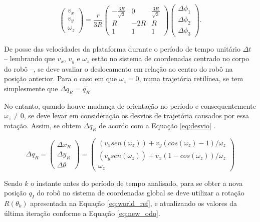 \begin{equation}
  \begin{pmatrix}
    v_x \\
    v_y \\
    \omega_z
  \end{pmatrix}
  =
  \frac{r}{3R}
  \begin{pmatrix}
    -\frac{3R}{\sqrt{3}} & 0   & \frac{3R}{\sqrt{3}} \\
    R                    & -2R & R                   \\
    1                    & 1   & 1
  \end{pmatrix}
  \begin{pmatrix}
    \Delta{\phi_1} \\
    \Delta{\phi_2} \\
    \Delta{\phi_3}
  \end{pmatrix}.
  \label{eq:odo}
\end{equation}

De posse das velocidades da plataforma durante o período de tempo unitário $\Delta t$ -- lembrando que $v_x$, $v_y$ e $\omega_z$ estão no sistema de coordenadas centrado no corpo do robô --, se deve avaliar o deslocamento em relação ao centro do robô na posição anterior. Para o caso em que $\omega_z = 0$, numa trajetória retilínea, se tem simplesmente que $\Delta q_R = \dot{q_R}$.

No entanto, quando houve mudança de orientação no período e consequentemente $\omega_z \neq 0$, se deve levar em consideração os desvios de trajetória causados por essa rotação. Assim, se obtem $\Delta q_R$ de acordo com a Equação \ref{eq:desvio} \citep{lynch2017modern}.

\begin{equation}
  \Delta q_R
  =
  \begin{pmatrix}
    \Delta x_R \\
    \Delta y_R \\
    \Delta\theta
  \end{pmatrix}
  =
  \begin{pmatrix}
    (v_x sen(\omega_z)) + v_y (cos(\omega_z) - 1)/\omega_z \\
    (v_y sen(\omega_z)) + v_x (1-cos(\omega_z)) / \omega_z \\
    \omega_z
  \end{pmatrix}
  \label{eq:desvio}
\end{equation}

Sendo $k$ o instante antes do período de tempo analisado, para se obter a nova posição $q_I$ do robô no sistema de coordenadas global se deve utilizar a rotação $R(\theta_k)$ apresentada na Equação \ref{eq:world_ref}, e atualizando os valores da última iteração conforme a Equação \ref{eq:new_odo}.

